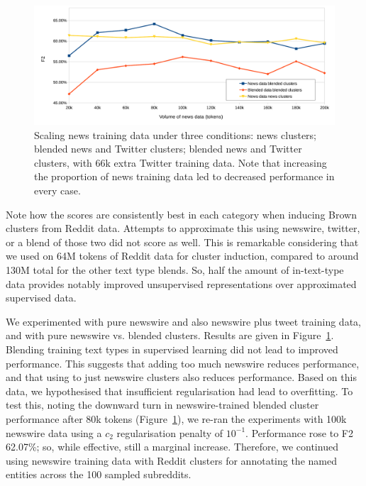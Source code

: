 \documentclass[sigconf,anonymous,review]{acmart}
\begin{document}
\begin{figure}
\centering
\includegraphics[width=\columnwidth]{entity-chunking/chart-results-rcv-crop.pdf}
\caption{Scaling news training data under three conditions: news clusters; blended news and Twitter clusters; blended news and Twitter clusters, with 66k extra Twitter training data. Note that increasing the proportion of news training data led to decreased performance in every case.}
\label{fig:rcv-scaling}
\end{figure}

Note how the scores are consistently best in each category when inducing Brown clusters from Reddit data.
Attempts to approximate this using newswire, twitter, or a blend of those two did not score as well.
This is remarkable considering that we used on 64M tokens of Reddit data for cluster induction, compared to around 130M total for the other text type blends.
So, half the amount of in-text-type data provides notably improved unsupervised representations over approximated supervised data.

We experimented with pure newswire and also newswire plus tweet training data, and with pure newswire vs. blended clusters.
Results are given in Figure~\ref{fig:rcv-scaling}.
Blending training text types in supervised learning did not lead to improved performance.
This suggests that adding too much newswire reduces performance, and that using to just newswire clusters also reduces performance.
Based on this data, we hypothesised that insufficient regularisation had lead to overfitting.
To test this, noting the downward turn in newswire-trained blended cluster performance after 80k tokens (Figure~\ref{fig:rcv-scaling}), we re-ran the experiments with 100k newswire data using a $c_2$ regularisation penalty of $10^{-1}$. %
Performance rose to F2 62.07\%; so, while effective, still a marginal increase.
Therefore, we continued using newswire training data with Reddit clusters for annotating the named entities across the 100 sampled subreddits.%
\end{document}
